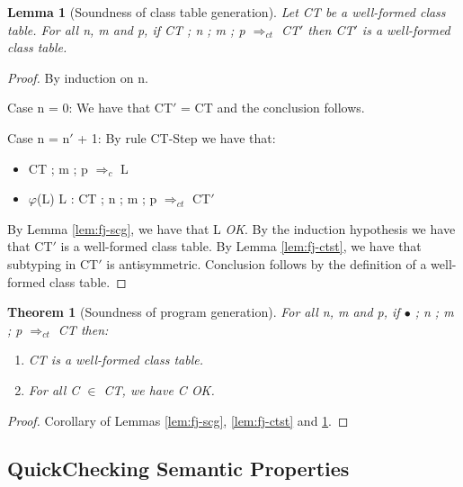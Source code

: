 \documentclass[tese,capa,english]{texufpel}
\newtheorem{theorem}{Theorem}
\newtheorem{lemma}{Lemma}
\begin{document}
\begin{lemma}[Soundness of class table generation]
\label{lem:fj-sctg}
Let \emph{CT} be a well-formed class table. For all n, m and p, if \emph{CT} ; n ; m ; p $\Rightarrow_{ct}$ \emph{CT}$'$ then \emph{CT}$'$ is a well-formed class table.
\end{lemma}

\begin{proof}
  By induction on n.

\vspace{5pt}

  Case n = 0: We have that CT$'$ = CT and the conclusion follows.

\vspace{5pt}

  Case n = n$'$ + 1: By rule {\footnotesize CT-Step} we have that:

\begin{itemize}
\item CT ; m ; p $\Rightarrow_c$ L
\item $\varphi$(L) L : CT ; n ; m ; p $\Rightarrow_{ct}$ CT$'$
\end{itemize}

By Lemma \ref{lem:fj-scg}, we have that L \emph{OK}. By the induction hypothesis we have that CT$'$ is a well-formed class table. By Lemma \ref{lem:fj-ctst}, we have that subtyping in CT$'$ is antisymmetric. Conclusion follows by the definition of a well-formed class table.
\end{proof}

\begin{theorem}[Soundness of program generation]
For all n, m and p, if $\bullet$ ; n ; m ; p $\Rightarrow_{ct}$ \emph{CT} then:

\begin{enumerate}
\item \emph{CT} is a well-formed class table.
\item For all \emph{C} $\in$ \emph{CT}, we have \emph{C} OK.
\end{enumerate}
\end{theorem}

\begin{proof}
Corollary of Lemmas \ref{lem:fj-scg}, \ref{lem:fj-ctst} and \ref{lem:fj-sctg}.
\end{proof}

\subsection{QuickChecking Semantic Properties}
\end{document}
